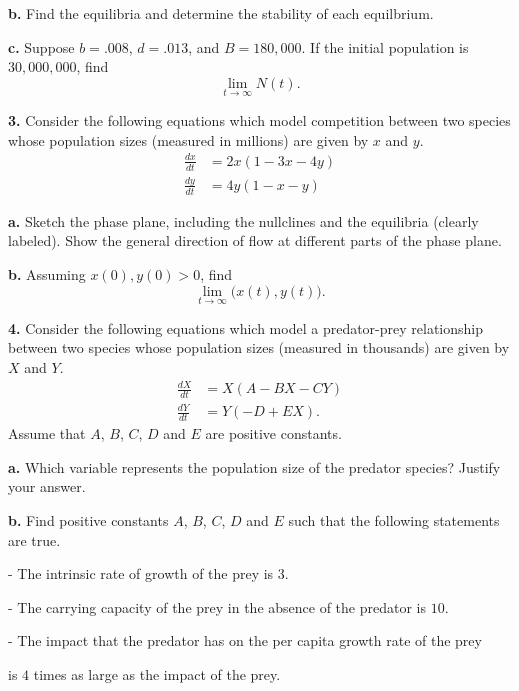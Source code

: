 \documentclass[reqno,12pt]{amsart}
\def \dxdt{\frac{dx}{dt}}
\def \dydt{\frac{dy}{dt}}
\def \dXdt{\frac{dX}{dt}}
\def \dYdt{\frac{dY}{dt}}
\begin{document}
\noindent
{\bf b.}  Find the equilibria and determine the stability of each equilbrium.

\noindent
{\bf c.}  Suppose $b=.008$, $d=.013$, and $B=180,000$.  If the
initial population is $30,000,000$, find
$$
\lim_{t \to \infty} N(t).
$$


\newpage
\vspace{1cm}

\noindent
{\bf 3.}  Consider the following equations which model competition between
two species whose population sizes (measured in millions) are given by $x$
and $y$.
$$
\begin{aligned}
\dxdt &= 2x (1 - 3x - 4y)	\\
\dydt &= 4y (1 -  x -  y)
\end{aligned}
$$

\noindent
{\bf a.}  Sketch the phase plane, including the nullclines and the
equilibria (clearly labeled).  Show the general direction of
flow at different parts of the phase plane.

\noindent
{\bf b.}  Assuming $x(0), y(0) > 0$, find
$$
\lim_{t \to \infty} \bigl( x(t), y(t) \bigr).
$$


\vspace{3cm}

\noindent
{\bf 4.}  Consider the following equations which model a predator-prey
relationship between two species whose population sizes (measured in
thousands) are given by $X$ and $Y$.
$$
\begin{aligned}
\dXdt &= X (  A - BX - CY)		\\
\dYdt &= Y ( -D + EX).
\end{aligned}
$$
Assume that $A$, $B$, $C$, $D$ and $E$ are positive constants.

\vspace{.5cm}

\noindent
{\bf a.} Which variable represents the population size of the predator
species?  Justify your answer.

\noindent
{\bf b.} Find positive constants $A$, $B$, $C$, $D$ and $E$ such that
the following statements are true.

- The intrinsic rate of growth of the prey is $3$.

- The carrying capacity of the prey in the absence of the predator is $10$.

- The impact that the predator has on the per capita growth rate of the prey

\hspace{.2cm} is $4$ times as large as the impact of the prey.
\end{document}
